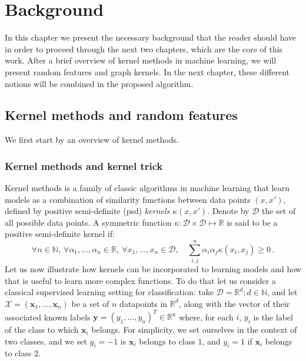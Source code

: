\newcommand{\todoNK}[1]{\textbf{\textcolor{red}{NK: #1}}}
\chapter{Background}
\label{chapter:background}
\newtheorem{theorem}{Theorem}
In this chapter we present the necessary background that the reader should have in order to proceed through the next two chapters, which are the core of this work. After a brief overview of kernel methods in machine learning, we will present random features and graph kernels. In the next chapter, these different notions will be combined in the proposed algorithm.

\section{Kernel methods and random features}

We first start by an overview of kernel methods.

\subsection{Kernel methods and kernel trick}
Kernel methods is a family of classic algorithms in machine learning that learn models as a combination of similarity functions between data points $(x,x')$, defined by positive semi-definite (psd) \emph{kernels} $\kappa(x,x')$. Denote by $\mathcal{D}$ the set of all possible data points. A symmetric function $\kappa:\mathcal{D}\times\mathcal{D}\mapsto\mathbb{R}$ is said to be a positive semi-definite kernel if:
\begin{equation}
\forall n\in \mathbb{N},~\forall \alpha_1,\ldots,\alpha_n\in \mathbb{R},~\forall x_1,\ldots,x_n\in \mathcal{D},\quad \sum_{i,j}^n\alpha_i\alpha_j\kappa(x_i,x_j)\geq 0 \, .
\end{equation}
Let us now illustrate how kernels can be incorporated to learning models and how that is useful to learn more complex functions. To do that let us consider a classical supervised learning setting for classification: take $\mathcal{D}=\mathbb{R}^d; d\in\mathbb{N}$, and let $\mathcal{X}=(\mathbf{x}_1,\ldots,\mathbf{x}_n)$ be a set of $n$ datapoints in $\mathbb{R}^d$, along with the vector of their associated known labels $\mathbf{y}=(y_1,\ldots,y_n)^T\in\mathbb{R}^n$ where, for each $i$, $y_i$ is the label of the class to which $\mathbf{x}_i$ belongs. For simplicity, we set ourselves in the context of two classes, and we set $y_i=-1$ is $\mathbf{x}_i$ belongs to class $1$, and $y_i=1$ if $\mathbf{x}_i$ belongs to class $2$. 

